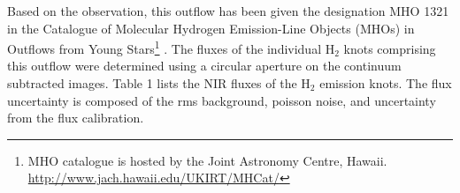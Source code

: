 \documentclass[iop]{emulateapj}
\begin{document}
Based on the observation, this outflow has been given the designation
MHO 1321 in the Catalogue of Molecular Hydrogen Emission-Line Objects
(MHOs) in Outflows from Young Stars\footnote{MHO catalogue is hosted by the Joint Astronomy Centre, Hawaii. \url{http://www.jach.hawaii.edu/UKIRT/MHCat/}} \citep{dav2009}. 
The fluxes of the individual
H$_2$ knots comprising this outflow were determined using a circular
aperture on the continuum subtracted images. Table 1 lists the NIR fluxes of
the H$_2$ emission knots. The flux
uncertainty is composed of the rms background, poisson noise, and
uncertainty from the flux calibration.


\begin{figure*}
\caption{ Near-infrared images of the outflow: 
a) H$_2$ 1--0 S(1) 2.122 $\mu$m line, 
b) K$_{\rm{cont}}$,
c) continuum subtracted H$_2$ 1--0 S(1) 2.122 $\mu$m,
d) continuum subtracted H$_2$ 1--0 S(2) 2.034 $\mu$m.
The horizontal scale is in arcminutes and the vertical
scale is in arcseconds. The origin is set at 
($\alpha$,$\delta$)(J2000) =
($06^{\rm{h}}35^{\rm{m}}25\fs 0$, $+03\arcdeg56\arcmin21\arcsec$)
}
\end{figure*}
\end{document}
